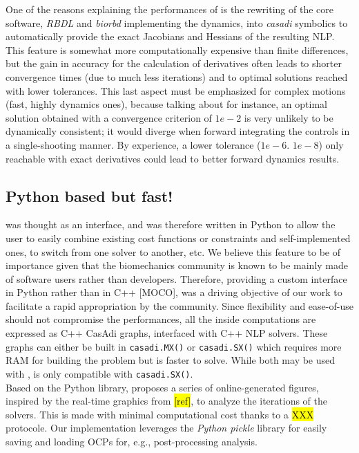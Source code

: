 One of the reasons explaining the performances of \bioptim is the rewriting of the core software, \textit{RBDL} and \textit{biorbd} implementing the dynamics, into \textit{casadi} symbolics to automatically provide the exact Jacobians and Hessians of the resulting NLP.  
This feature is somewhat more computationally expensive than finite differences, but the gain in accuracy for the calculation of derivatives often leads to shorter convergence times (due to much less iterations) and to optimal solutions reached with lower tolerances.
This last aspect must be emphasized for complex motions (fast, highly dynamics ones), because talking about \ipopt for instance, an optimal solution obtained with a convergence criterion of $1e-2$ is very unlikely to be dynamically consistent; 
it would diverge when forward integrating the controls in a single-shooting manner. 
By experience, a lower tolerance ($1e-6$. $1e-8$) only reachable with exact derivatives could lead to better forward dynamics results.

\subsection{Python based but fast!}

\bioptim was thought as an interface, and was therefore written in Python to allow the user to easily combine existing cost functions or constraints and self-implemented ones, to switch from one solver to another, etc. 
We believe this feature to be of importance given that the biomechanics community is known to be mainly made of software users rather than developers.
Therefore, providing a custom interface in Python rather than in C++ [MOCO], was a driving objective of our work to facilitate a rapid appropriation by the community.
Since flexibility and ease-of-use should not compromise the performances, all the inside computations are expressed as C++ CasAdi graphs, interfaced with C++ NLP solvers.
These graphs can either be built in \texttt{casadi.MX()} or \texttt{casadi.SX()} which requires more RAM for building the problem but is faster to solve.
While both may be used with \ipopt, \acados is only compatible with \texttt{casadi.SX()}.\\
Based on the \bioviz Python library, \bioptim proposes a series of online-generated figures, inspired by the  real-time graphics from \muscodii \hl{[ref]}, to analyze the iterations of the solvers.
This is made with minimal computational cost thanks to a \hl{XXX} protocole. 
Our implementation leverages the \textit{Python pickle} library for easily saving and loading OCPs for, e.g., post-processing analysis.

